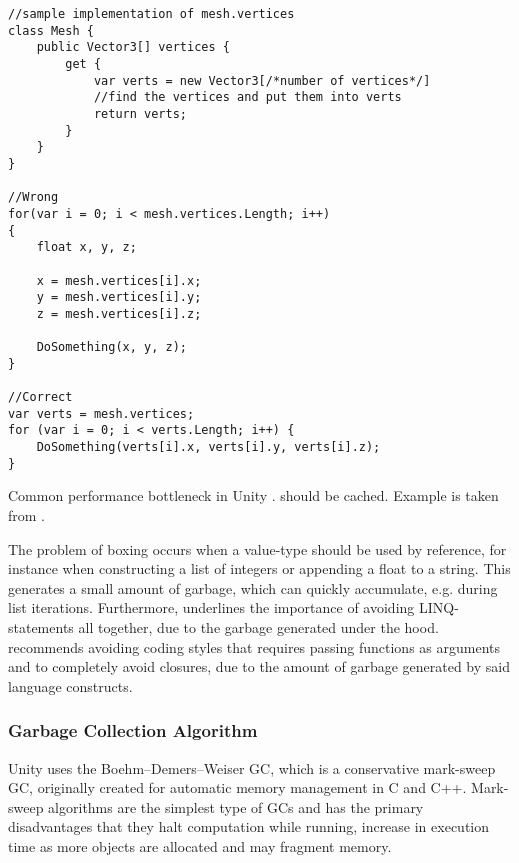 \begin{listing}
\begin{verbatim}
//sample implementation of mesh.vertices
class Mesh {
    public Vector3[] vertices {
        get {
            var verts = new Vector3[/*number of vertices*/]
            //find the vertices and put them into verts
            return verts;
        }
    }
}

//Wrong
for(var i = 0; i < mesh.vertices.Length; i++)
{
    float x, y, z;

    x = mesh.vertices[i].x;
    y = mesh.vertices[i].y;
    z = mesh.vertices[i].z;

    DoSomething(x, y, z);
}

//Correct
var verts = mesh.vertices;
for (var i = 0; i < verts.Length; i++) {
    DoSomething(verts[i].x, verts[i].y, verts[i].z);
}
\end{verbatim}
\caption{Common performance bottleneck in Unity \cite{unity:heap}.  should be cached. Example is taken from \cite{unity:heap}.} \label{lst:unity:array:prop}
\end{listing}

The problem of boxing occurs when a value-type should be used by reference, for instance when constructing a list of integers or appending a float to a string. This generates a small amount of garbage, which can quickly accumulate, e.g. during list iterations. Furthermore, \cite{unity:optimisation} underlines the importance of avoiding \gls{LINQ}-statements all together, due to the garbage generated under the hood. \cite{unity:heap} recommends avoiding coding styles that requires passing functions as arguments and to completely avoid closures, due to the amount of garbage generated by said language constructs.

\subsubsection{Garbage Collection Algorithm}\label{sec:gc-strat}
Unity uses the Boehm–Demers–Weiser \gls{GC}, which is a conservative mark-sweep \gls{GC}\cite{unity:heap}, originally created for automatic memory management in C and C++\cite{boehm2007transparent}. Mark-sweep algorithms are the simplest type of \glspl{GC} and has the primary disadvantages that they halt computation while running, increase in execution time as more objects are allocated and may fragment memory\cite{sestoft2017programming}.

